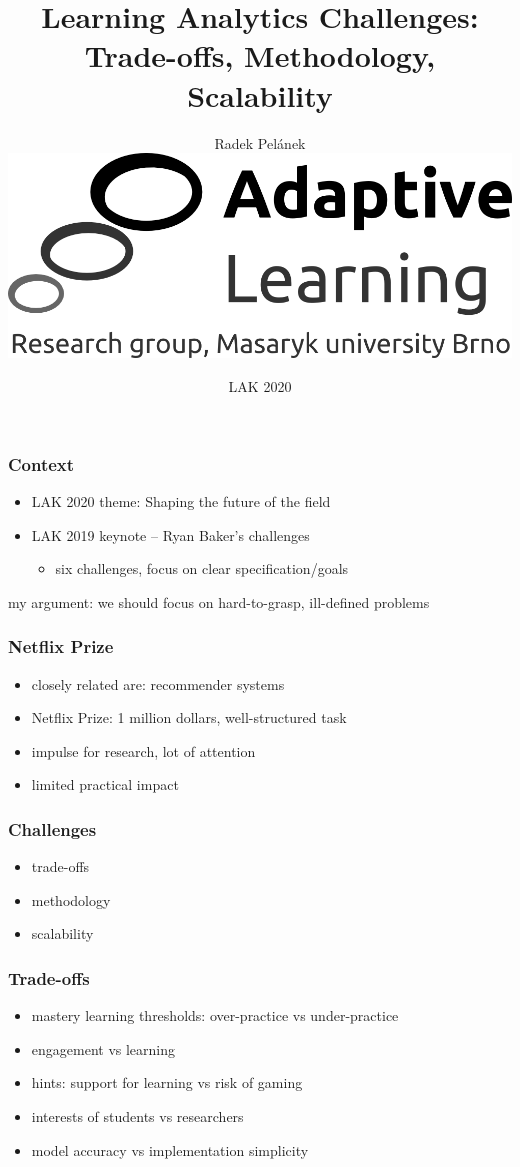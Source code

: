 \documentclass[bigger]{beamer}
\title{Learning Analytics Challenges: Trade-offs, Methodology, Scalability}
\author{Radek Pel\'anek\\[10mm]
\includegraphics[width=.3\linewidth]{al-logo}
}
\date{LAK 2020}
\begin{document}
\frame{\titlepage}

\begin{frame}
  \frametitle{Context}

  \begin{itemize}
  \item LAK 2020 theme: Shaping the future of the field
  \item LAK 2019 keynote -- Ryan Baker's challenges
    \begin{itemize}
    \item six challenges, focus on clear specification/goals
    \end{itemize}
  \end{itemize}

  my argument: we should focus on hard-to-grasp, ill-defined problems 
\end{frame}

\begin{frame}
  \frametitle{Netflix Prize}

  \begin{itemize}
  \item closely related are: recommender systems
  \item Netflix Prize: 1 million dollars, well-structured task
  \item impulse for research, lot of attention
  \item limited practical impact
  \end{itemize}
\end{frame}

\begin{frame}
  \frametitle{Challenges}

  \begin{itemize}
  \item trade-offs
  \item methodology
  \item scalability
  \end{itemize}
\end{frame}

\begin{frame}
  \frametitle{Trade-offs}

  \begin{itemize}
  \item mastery learning thresholds: over-practice vs under-practice
  \item engagement vs learning
  \item hints: support for learning vs risk of gaming
  \item interests of students vs researchers
  \item model accuracy vs implementation simplicity
  \end{itemize}
\end{frame}
\end{document}
